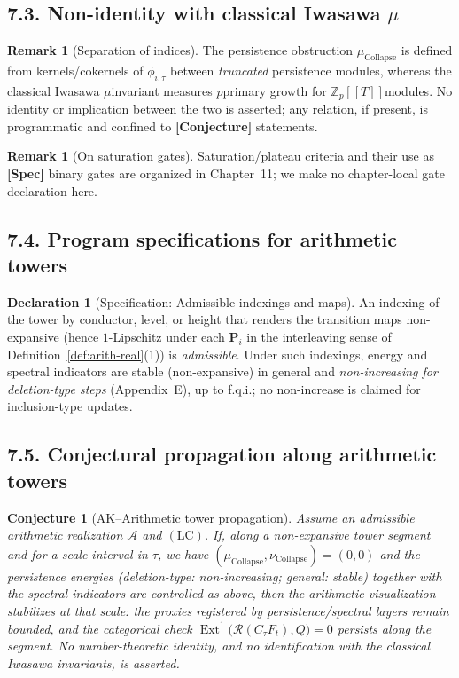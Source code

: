 \documentclass[11pt]{article}
\DeclareMathOperator{\Ext}{Ext}
\DeclareRobustCommand{\hyp}{\nobreakdash-}
\newcommand{\Rfun}{\mathcal{R}}
\numberwithin{equation}{section}
\newtheorem{conjecture}{Conjecture}[section]
\theoremstyle{definition}
\newtheorem{remark}[theorem]{Remark}
\newtheorem{declaration}[theorem]{Declaration}
\DeclareRobustCommand{\muc}{\mu_{\mathrm{Collapse}}}
\DeclareRobustCommand{\nuc}{\nu_{\mathrm{Collapse}}}
\DeclareRobustCommand{\LC}{\texorpdfstring{\ensuremath{\mathrm{(LC)}}}{(LC)}}
\begin{document}
\subsection*{7.3. Non\hyp identity with classical Iwasawa \(\mu\)}
\begin{remark}[Separation of indices]\label{rk:separation}
The persistence obstruction \(\muc\) is defined from kernels/cokernels of \(\phi_{i,\tau}\) between \emph{truncated} persistence modules, whereas the classical Iwasawa \(\mu\)\nobreakdash invariant measures \(p\)\nobreakdash primary growth for \(\mathbb{Z}_p[[T]]\)\nobreakdash modules.
No identity or implication between the two is asserted; any relation, if present, is programmatic and confined to \textbf{[Conjecture]} statements.
\end{remark}

\begin{remark}[On saturation gates]
Saturation/plateau criteria and their use as \textbf{[Spec]} binary gates are organized in Chapter~11; we make no chapter\hyp local gate declaration here.
\end{remark}

\subsection*{7.4. Program specifications for arithmetic towers}
\begin{declaration}[Specification: Admissible indexings and maps]\label{spec:indexing}
An indexing of the tower by conductor, level, or height that renders the transition maps non\hyp expansive (hence \(1\)\hyp Lipschitz under each \(\mathbf{P}_i\) in the interleaving sense of Definition~\ref{def:arith-real}(1)) is \emph{admissible}.
Under such indexings, energy and spectral indicators are stable (non\hyp expansive) in general and \emph{non\hyp increasing for deletion\hyp type steps} (Appendix~E), up to f.q.i.; no non\hyp increase is claimed for inclusion\hyp type updates.
\end{declaration}

\subsection*{7.5. Conjectural propagation along arithmetic towers}
\begin{conjecture}[AK–Arithmetic tower propagation]\label{conj:arith-prop}
Assume an admissible arithmetic realization $\mathcal{A}$ and \LC.
If, along a non\hyp expansive tower segment and for a scale interval in $\tau$, we have $(\muc,\nuc)=(0,0)$ and the persistence energies (deletion\hyp type: non\hyp increasing; general: stable) together with the spectral indicators are controlled as above, then the arithmetic visualization stabilizes at that scale:
the proxies registered by persistence/spectral layers remain bounded, and the categorical check
\(\Ext^1\big(\Rfun(C_\tau F_t),Q\big)=0\) persists along the segment.
No number\hyp theoretic identity, and no identification with the classical Iwasawa invariants, is asserted.
\end{conjecture}
\end{document}
